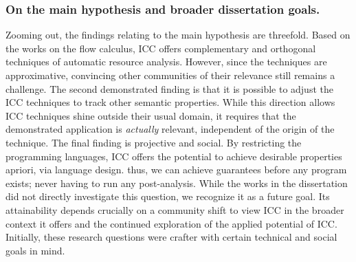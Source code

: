 \subsubsection*{On the main hypothesis and broader dissertation goals.}
Zooming out, the findings relating to the main hypothesis are threefold.
Based on the works on the flow calculus, ICC offers complementary and orthogonal techniques of automatic resource analysis.
However, since the techniques are approximative, convincing other communities of their relevance still remains a challenge.
The second demonstrated finding is that it is possible to adjust the ICC techniques to track other semantic properties.
While this direction allows ICC techniques shine outside their usual domain, it requires that the demonstrated application is \emph{actually} relevant, independent of the origin of the technique.
The final finding is projective and social.
By restricting the programming languages, ICC offers the potential to achieve desirable properties apriori, via language design.
thus, we can achieve guarantees before any program exists;
never having to run any post-analysis.
While the works in the dissertation did not directly investigate this question, we recognize it as a future goal.
Its attainability depends crucially on a community shift to view ICC in the broader context it offers and the continued exploration of the applied potential of ICC.
Initially, these research questions were crafter with certain technical and social goals in mind.
